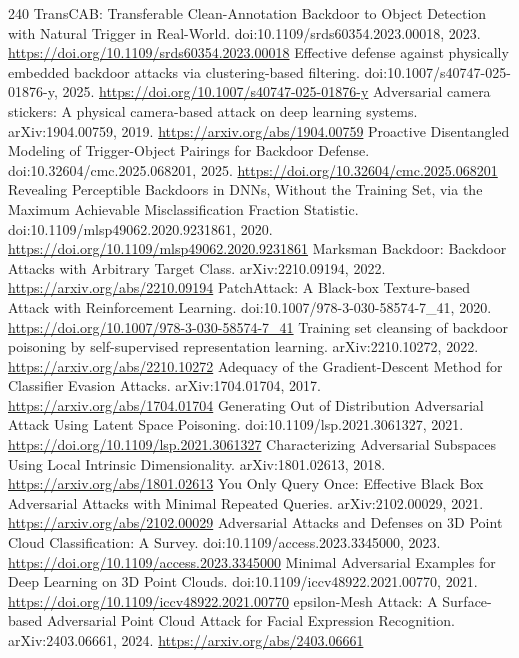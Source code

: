 \documentclass[11pt]{article}
\begin{document}
\begin{thebibliography}{240}
 TransCAB: Transferable Clean-Annotation Backdoor to Object Detection with Natural Trigger in Real-World. doi:10.1109/srds60354.2023.00018, 2023. \url{https://doi.org/10.1109/srds60354.2023.00018}
 Effective defense against physically embedded backdoor attacks via clustering-based filtering. doi:10.1007/s40747-025-01876-y, 2025. \url{https://doi.org/10.1007/s40747-025-01876-y}
 Adversarial camera stickers: A physical camera-based attack on deep learning systems. arXiv:1904.00759, 2019. \url{https://arxiv.org/abs/1904.00759}
 Proactive Disentangled Modeling of Trigger-Object Pairings for Backdoor Defense. doi:10.32604/cmc.2025.068201, 2025. \url{https://doi.org/10.32604/cmc.2025.068201}
 Revealing Perceptible Backdoors in DNNs, Without the Training Set, via the Maximum Achievable Misclassification Fraction Statistic. doi:10.1109/mlsp49062.2020.9231861, 2020. \url{https://doi.org/10.1109/mlsp49062.2020.9231861}
 Marksman Backdoor: Backdoor Attacks with Arbitrary Target Class. arXiv:2210.09194, 2022. \url{https://arxiv.org/abs/2210.09194}
 PatchAttack: A Black-box Texture-based Attack with Reinforcement Learning. doi:10.1007/978-3-030-58574-7\_41, 2020. \url{https://doi.org/10.1007/978-3-030-58574-7_41}
 Training set cleansing of backdoor poisoning by self-supervised representation learning. arXiv:2210.10272, 2022. \url{https://arxiv.org/abs/2210.10272}
 Adequacy of the Gradient-Descent Method for Classifier Evasion Attacks. arXiv:1704.01704, 2017. \url{https://arxiv.org/abs/1704.01704}
 Generating Out of Distribution Adversarial Attack Using Latent Space Poisoning. doi:10.1109/lsp.2021.3061327, 2021. \url{https://doi.org/10.1109/lsp.2021.3061327}
 Characterizing Adversarial Subspaces Using Local Intrinsic Dimensionality. arXiv:1801.02613, 2018. \url{https://arxiv.org/abs/1801.02613}
 You Only Query Once: Effective Black Box Adversarial Attacks with Minimal Repeated Queries. arXiv:2102.00029, 2021. \url{https://arxiv.org/abs/2102.00029}
 Adversarial Attacks and Defenses on 3D Point Cloud Classification: A Survey. doi:10.1109/access.2023.3345000, 2023. \url{https://doi.org/10.1109/access.2023.3345000}
 Minimal Adversarial Examples for Deep Learning on 3D Point Clouds. doi:10.1109/iccv48922.2021.00770, 2021. \url{https://doi.org/10.1109/iccv48922.2021.00770}
 epsilon-Mesh Attack: A Surface-based Adversarial Point Cloud Attack for Facial Expression Recognition. arXiv:2403.06661, 2024. \url{https://arxiv.org/abs/2403.06661}

\end{thebibliography}
\end{document}
